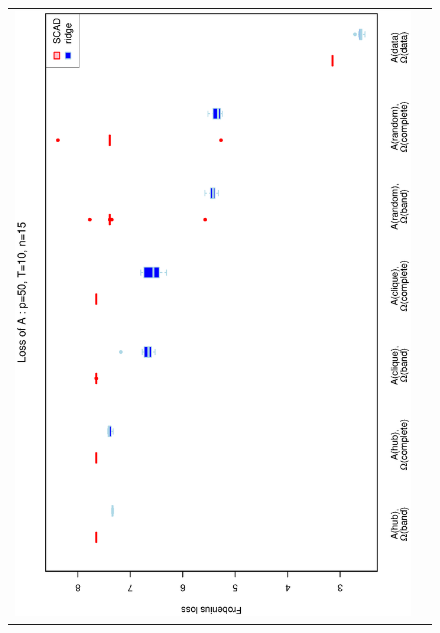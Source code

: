 \begin{figure}[h!]
\centering
\begin{tabular}{cc}
\includegraphics[scale=0.45,angle=270]{LossA50T10N15_25.eps}
\\

\end{tabular}
\end{figure}
